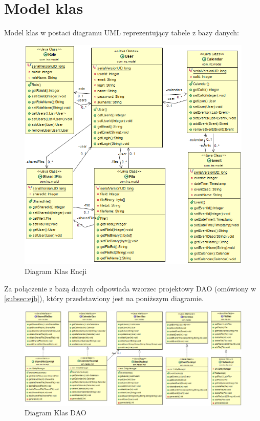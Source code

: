 \section{Model klas}
Model klas w postaci diagramu UML reprezentujący tabele z bazy danych:
\begin{figure}[H]
\centering
\includegraphics[scale=0.5]{ENTITIES}
\caption{\label{fig:uml_01}Diagram Klas Encji}
\end{figure}
Za połączenie z bazą danych odpowiada wzorzec projektowy DAO (omówiony w \ref{subsec:ejb}), który przedstawiony jest na poniższym diagramie.
\begin{figure}[H]
\centering
\includegraphics[scale=0.5,angle=90,origin=c]{DAO_UML}
\caption{\label{fig:uml_02}Diagram Klas DAO}
\end{figure}